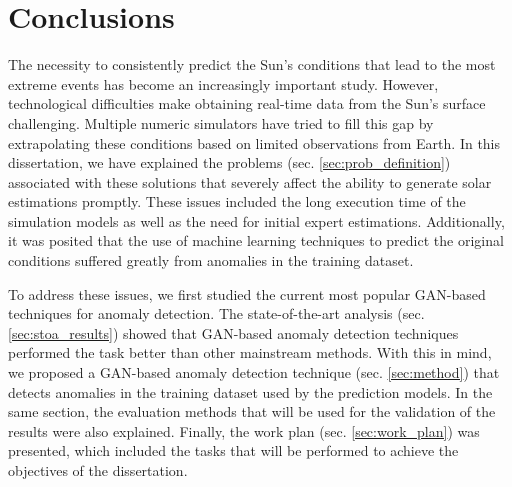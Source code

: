 \chapter{Conclusions} \label{chap:conclusion}

The necessity to consistently predict the Sun's conditions that lead to the most extreme events has become an increasingly important study. However, technological difficulties make obtaining real-time data from the Sun's surface challenging. Multiple numeric simulators have tried to fill this gap by extrapolating these conditions based on limited observations from Earth. In this dissertation, we have explained the problems (sec. \ref{sec:prob_definition}) associated with these solutions that severely affect the ability to generate solar estimations promptly. These issues included the long execution time of the simulation models as well as the need for initial expert estimations. Additionally, it was posited that the use of machine learning techniques to predict the original conditions suffered greatly from anomalies in the training dataset.

To address these issues, we first studied the current most popular GAN-based techniques for anomaly detection. The state-of-the-art analysis (sec. \ref{sec:stoa_results}) showed that GAN-based anomaly detection techniques performed the task better than other mainstream methods. With this in mind, we proposed a GAN-based anomaly detection technique (sec. \ref{sec:method}) that detects anomalies in the training dataset used by the prediction models. In the same section, the evaluation methods that will be used for the validation of the results were also explained. Finally, the work plan (sec. \ref{sec:work_plan}) was presented, which included the tasks that will be performed to achieve the objectives of the dissertation.




